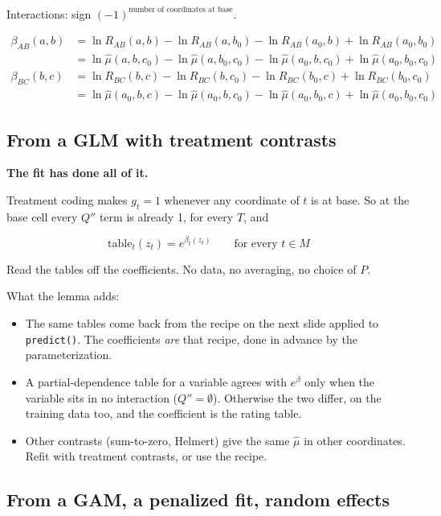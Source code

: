 \documentclass[
  letterpaper,
  DIV=11,
  numbers=noendperiod]{scrartcl}
\providecommand{\tightlist}{%
  \setlength{\itemsep}{0pt}\setlength{\parskip}{0pt}}
\begin{document}
Interactions: sign \((-1)^{\text{number of coordinates at base}}\).

\[
\begin{aligned}
\beta_{AB}(a, b) &= \ln R_{AB}(a, b) - \ln R_{AB}(a, b_0) - \ln R_{AB}(a_0, b) + \ln R_{AB}(a_0, b_0)\\
&= \ln \hat{\mu}(a, b, c_0) - \ln \hat{\mu}(a, b_0, c_0) - \ln \hat{\mu}(a_0, b, c_0) + \ln \hat{\mu}(a_0, b_0, c_0)\\[8pt]
\beta_{BC}(b, c) &= \ln R_{BC}(b, c) - \ln R_{BC}(b, c_0) - \ln R_{BC}(b_0, c) + \ln R_{BC}(b_0, c_0)\\
&= \ln \hat{\mu}(a_0, b, c) - \ln \hat{\mu}(a_0, b, c_0) - \ln \hat{\mu}(a_0, b_0, c) + \ln \hat{\mu}(a_0, b_0, c_0)
\end{aligned}
\]

\subsection{From a GLM with treatment
contrasts}\label{from-a-glm-with-treatment-contrasts}

\textbf{The fit has done all of it.}

Treatment coding makes \(g_t = 1\) whenever any coordinate of \(t\) is
at base. So at the base cell every \(Q''\) term is already 1, for every
\(T\), and

\[
\text{table}_t(z_t) = e^{\beta_t(z_t)} \qquad \text{for every } t \in M
\]

Read the tables off the coefficients. No data, no averaging, no choice
of \(P\).

What the lemma adds:

\begin{itemize}
\tightlist
\item
  The same tables come back from the recipe on the next slide applied to
  \texttt{predict()}. The coefficients \emph{are} that recipe, done in
  advance by the parameterization.
\item
  A partial-dependence table for a variable agrees with \(e^{\beta}\)
  only when the variable sits in no interaction (\(Q'' = \emptyset\)).
  Otherwise the two differ, on the training data too, and the
  coefficient is the rating table.
\item
  Other contrasts (sum-to-zero, Helmert) give the same \(\hat{\mu}\) in
  other coordinates. Refit with treatment contrasts, or use the recipe.
\end{itemize}

\subsection{From a GAM, a penalized fit, random
effects}\label{from-a-gam-a-penalized-fit-random-effects}
\end{document}
